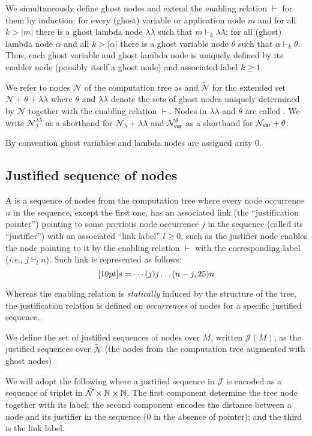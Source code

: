 \documentclass{article}
\makeatletter
\theoremstyle{definition}
\newcommand\Nodes{\mathcal{N}}%
\newcommand\NodesVar{\Nodes_{\sf var}}%
\newcommand\NodesLmd{\Nodes_\lambda}%
\newcommand{\ghostlmd}{{\lambda\!\!\lambda}}
\newcommand{\ghostvar}{\theta}
\newcommand\ImNodesVar{\NodesVar^\ghostvar}
\newcommand\ImNodesLmd{\NodesLmd^\ghostlmd}
\newcommand{\enables}{\vdash} %
\renewcommand\ie{{\it i.e.\@\xspace}}
\def\justseqset{\mathcal{J}}
\makeatother
\begin{document}
We simultaneously define ghost nodes and extend the enabling relation $\enables$ for them by induction: for every (ghost) variable or application node $m$ and for all $k>|m|$ there is a ghost lambda node $\ghostlmd$ such that $m \enables_k \ghostlmd$; for all (ghost) lambda node $\alpha$ and all $k>|\alpha|$ there is a ghost variable node $\ghostvar$ such that $\alpha \enables_k \ghostvar$. Thus, each ghost variable and ghost lambda node is uniquely defined by its enabler node (possibly itself a ghost node) and associated label $k\geq 1$.

We refer to nodes $\Nodes$ of the computation tree as 
and $\tilde{\Nodes}$ for the extended set $\Nodes + \ghostvar + \ghostlmd$ where $\ghostvar$ and $\ghostlmd$ denote the sets of ghost nodes uniquely determined by $\Nodes$ together with the enabling relation $\enables$. Nodes in $\ghostlmd$ and $\ghostvar$ are called . We write $\ImNodesLmd$ as a shorthand for $\NodesLmd + \ghostlmd$ and $\ImNodesVar$ as a shorthand for $\NodesVar + \ghostvar$.

By convention ghost variables and lambda nodes are assigned arity $0$.

\subsection{Justified sequence of nodes}
\label{sec:justseq}

A  is a sequence of nodes from the computation tree where every node occurrence $n$ in the sequence, except the first one, has an associated link (the ``justification pointer'') pointing to some previous node occurrence $j$ in the sequence (called its ``justifier'') with an associated ``link label'' $l\geq0$, such as the justifier node enables the node pointing to it by the enabling relation $\enables$ with the corresponding label (\ie, $j \enables_l n$). Such link is represented as follows:
$$\Pstr[10pt]{ s = \cdots (j){j} \ldots (n-j,25){n} }$$

Whereas the enabling relation is \emph{statically} induced by the structure of the tree, the justification relation is defined on \emph{occurrences} of nodes for a specific justified sequence.

We define the set of justified sequences of nodes over $M$, written $\justseqset(M)$, as the justified sequences over $\tilde{\Nodes}$ (the nodes from the computation tree augmented with ghost nodes).

We will adopt the following  where a justified sequence in $\justseqset$ is encoded as a sequence of triplet in $\tilde{\Nodes}\times\nat\times\nat$. The first component determine the tree node together with its label; the second component encodes the distance between a node and its justifier in the sequence ($0$ in the absence of pointer); and the third is the link label.
\end{document}
